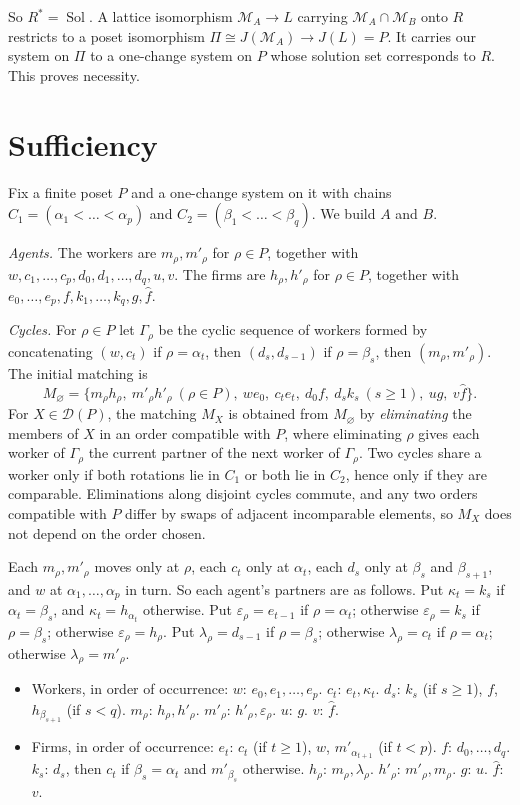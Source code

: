 \documentclass[11pt]{article}
\theoremstyle{definition}
\theoremstyle{remark}
\newcommand{\D}{\mathcal D}
\newcommand{\Sol}{\operatorname{Sol}}
\begin{document}
So $R^*=\Sol$. A lattice isomorphism $\mathcal M_A\to L$ carrying $\mathcal M_A\cap\mathcal M_B$ onto $R$ restricts to a poset isomorphism $\Pi\cong J(\mathcal M_A)\to J(L)=P$. It carries our system on $\Pi$ to a one-change system on $P$ whose solution set corresponds to $R$. This proves necessity.

\section{Sufficiency}

Fix a finite poset $P$ and a one-change system on it with chains $C_1=(\alpha_1<\dots<\alpha_p)$ and $C_2=(\beta_1<\dots<\beta_q)$. We build $A$ and $B$.

\emph{Agents.} The workers are $m_\rho,m'_\rho$ for $\rho\in P$, together with $w,c_1,\dots,c_p,d_0,d_1,\dots,d_q,u,v$. The firms are $h_\rho,h'_\rho$ for $\rho\in P$, together with $e_0,\dots,e_p,f,k_1,\dots,k_q,g,\hat f$.

\emph{Cycles.} For $\rho\in P$ let $\Gamma_\rho$ be the cyclic sequence of workers formed by concatenating $(w,c_t)$ if $\rho=\alpha_t$, then $(d_s,d_{s-1})$ if $\rho=\beta_s$, then $(m_\rho,m'_\rho)$. The initial matching is
\[
M_\varnothing=\{m_\rho h_\rho,\ m'_\rho h'_\rho\ (\rho\in P),\ we_0,\ c_te_t,\ d_0f,\ d_sk_s\ (s\ge1),\ ug,\ v\hat f\}.
\]
For $X\in\D(P)$, the matching $M_X$ is obtained from $M_\varnothing$ by \emph{eliminating} the members of $X$ in an order compatible with $P$, where eliminating $\rho$ gives each worker of $\Gamma_\rho$ the current partner of the next worker of $\Gamma_\rho$. Two cycles share a worker only if both rotations lie in $C_1$ or both lie in $C_2$, hence only if they are comparable. Eliminations along disjoint cycles commute, and any two orders compatible with $P$ differ by swaps of adjacent incomparable elements, so $M_X$ does not depend on the order chosen.

Each $m_\rho,m'_\rho$ moves only at $\rho$, each $c_t$ only at $\alpha_t$, each $d_s$ only at $\beta_s$ and $\beta_{s+1}$, and $w$ at $\alpha_1,\dots,\alpha_p$ in turn. So each agent's partners are as follows. Put $\kappa_t=k_s$ if $\alpha_t=\beta_s$, and $\kappa_t=h_{\alpha_t}$ otherwise. Put $\varepsilon_\rho=e_{t-1}$ if $\rho=\alpha_t$; otherwise $\varepsilon_\rho=k_s$ if $\rho=\beta_s$; otherwise $\varepsilon_\rho=h_\rho$. Put $\lambda_\rho=d_{s-1}$ if $\rho=\beta_s$; otherwise $\lambda_\rho=c_t$ if $\rho=\alpha_t$; otherwise $\lambda_\rho=m'_\rho$.
\begin{itemize}
\item Workers, in order of occurrence: $w$: $e_0,e_1,\dots,e_p$. $c_t$: $e_t,\kappa_t$. $d_s$: $k_s$ (if $s\ge1$), $f$, $h_{\beta_{s+1}}$ (if $s<q$). $m_\rho$: $h_\rho,h'_\rho$. $m'_\rho$: $h'_\rho,\varepsilon_\rho$. $u$: $g$. $v$: $\hat f$.
\item Firms, in order of occurrence: $e_t$: $c_t$ (if $t\ge1$), $w$, $m'_{\alpha_{t+1}}$ (if $t<p$). $f$: $d_0,\dots,d_q$. $k_s$: $d_s$, then $c_t$ if $\beta_s=\alpha_t$ and $m'_{\beta_s}$ otherwise. $h_\rho$: $m_\rho,\lambda_\rho$. $h'_\rho$: $m'_\rho,m_\rho$. $g$: $u$. $\hat f$: $v$.
\end{itemize}
\end{document}
